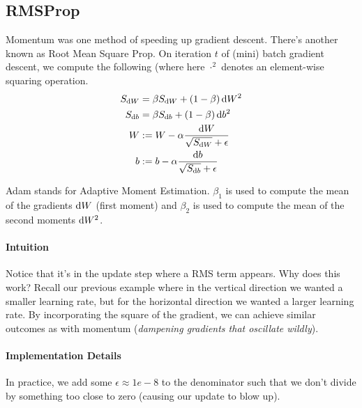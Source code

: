 \documentclass[12pt]{article}
\begin{document}
\subsection{RMSProp} Momentum was one method of speeding up gradient descent. There's another known as Root Mean Square Prop. On iteration $t$ of (mini) batch gradient descent, we compute the following (where here $\cdot^2$ denotes an element-wise squaring operation.
\begin{align*}   S_{\d W} &= \beta S_{\d W} + (1-\beta) \d W^2 \\ %
  S_{\d b} &= \beta S_{\d b} + (1-\beta) \d b^2 \\ %
  W &:= W - \alpha \frac{\d W}{\sqrt{S_{\d W}} + \epsilon} \\
  b &:= b - \alpha \frac{\d b}{\sqrt{S_{\d b}} + \epsilon} \end{align*}

Adam stands for Adaptive Moment Estimation. $\beta_1$ is used to compute the mean of the gradients $\operatorname{d}\!{W}$ (first moment) and $\beta_2$ is used to compute the mean of the second moments $\operatorname{d}\!{W}^2$.

\paragraph{Intuition}
Notice that it's in the update step where a RMS term appears.
Why does this work? Recall our previous example where in the vertical direction we wanted a smaller learning rate, but for the horizontal direction we wanted a larger learning rate. By incorporating the square of the gradient, we can achieve similar outcomes as with momentum (\emph{dampening gradients that oscillate wildly}).

\paragraph{Implementation Details} In practice, we add some $\epsilon \approx 1e-8$ to the denominator such that we don't divide by something too close to zero (causing our update to blow up).
\end{document}
